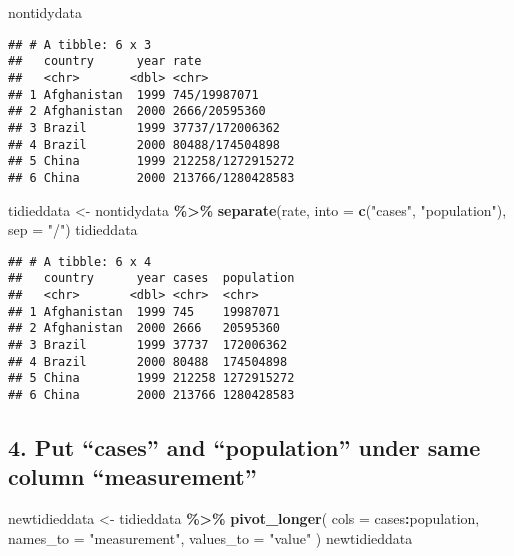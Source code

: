 \documentclass[
]{article}
\newenvironment{Shaded}{\begin{snugshade}}{\end{snugshade}}
\newcommand{\AttributeTok}[1]{\textcolor[rgb]{0.13,0.29,0.53}{#1}}
\newcommand{\FunctionTok}[1]{\textcolor[rgb]{0.13,0.29,0.53}{\textbf{#1}}}
\newcommand{\NormalTok}[1]{#1}
\newcommand{\OtherTok}[1]{\textcolor[rgb]{0.56,0.35,0.01}{#1}}
\newcommand{\SpecialCharTok}[1]{\textcolor[rgb]{0.81,0.36,0.00}{\textbf{#1}}}
\newcommand{\StringTok}[1]{\textcolor[rgb]{0.31,0.60,0.02}{#1}}
\begin{document}
\begin{Shaded}
\begin{Highlighting}[]
\NormalTok{nontidydata}
\end{Highlighting}
\end{Shaded}

\begin{verbatim}
## # A tibble: 6 x 3
##   country      year rate             
##   <chr>       <dbl> <chr>            
## 1 Afghanistan  1999 745/19987071     
## 2 Afghanistan  2000 2666/20595360    
## 3 Brazil       1999 37737/172006362  
## 4 Brazil       2000 80488/174504898  
## 5 China        1999 212258/1272915272
## 6 China        2000 213766/1280428583
\end{verbatim}

\begin{Shaded}
\begin{Highlighting}[]
\NormalTok{tidieddata }\OtherTok{\textless{}{-}}\NormalTok{ nontidydata }\SpecialCharTok{\%\textgreater{}\%}
\FunctionTok{separate}\NormalTok{(rate, }\AttributeTok{into =} \FunctionTok{c}\NormalTok{(}\StringTok{"cases"}\NormalTok{,}
\StringTok{"population"}\NormalTok{),}
\AttributeTok{sep =} \StringTok{"/"}\NormalTok{)}
\NormalTok{tidieddata}
\end{Highlighting}
\end{Shaded}

\begin{verbatim}
## # A tibble: 6 x 4
##   country      year cases  population
##   <chr>       <dbl> <chr>  <chr>     
## 1 Afghanistan  1999 745    19987071  
## 2 Afghanistan  2000 2666   20595360  
## 3 Brazil       1999 37737  172006362 
## 4 Brazil       2000 80488  174504898 
## 5 China        1999 212258 1272915272
## 6 China        2000 213766 1280428583
\end{verbatim}

\hypertarget{put-cases-and-population-under-same-column-measurement}{%
\subsection{4. Put ``cases'' and ``population'' under same column
``measurement''}\label{put-cases-and-population-under-same-column-measurement}}

\begin{Shaded}
\begin{Highlighting}[]
\NormalTok{newtidieddata }\OtherTok{\textless{}{-}}\NormalTok{ tidieddata }\SpecialCharTok{\%\textgreater{}\%}
\FunctionTok{pivot\_longer}\NormalTok{(}
\AttributeTok{cols =}\NormalTok{ cases}\SpecialCharTok{:}\NormalTok{population,}
\AttributeTok{names\_to =} \StringTok{"measurement"}\NormalTok{,}
\AttributeTok{values\_to =} \StringTok{"value"}
\NormalTok{)}
\NormalTok{newtidieddata}
\end{Highlighting}
\end{Shaded}
\end{document}
